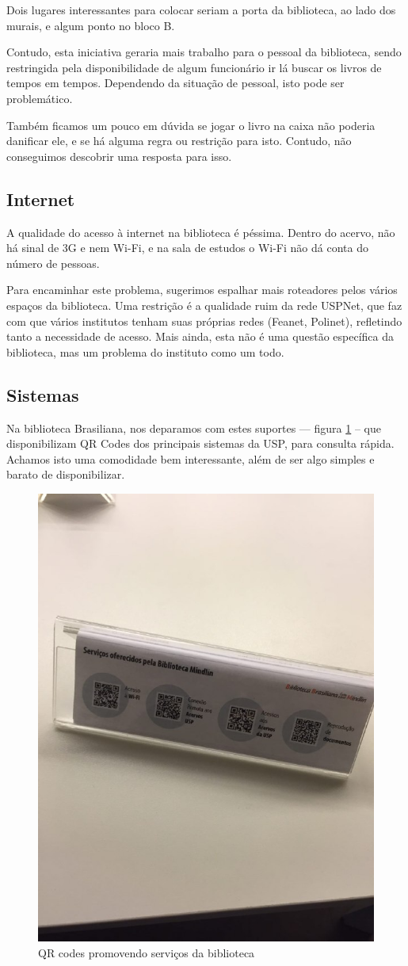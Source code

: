 \documentclass[titlepage]{article}
\begin{document}
Dois lugares interessantes para colocar seriam a porta da biblioteca, ao lado 
dos murais, e algum ponto no bloco B.

Contudo, esta iniciativa geraria mais trabalho para o pessoal da biblioteca,
sendo restringida pela disponibilidade de algum funcionário ir lá buscar os 
livros de tempos em tempos. Dependendo da situação de pessoal, isto pode ser
problemático.

Também ficamos um pouco em dúvida se jogar o livro na caixa não poderia 
danificar ele, e se há alguma regra ou restrição para isto. Contudo, não 
conseguimos descobrir uma resposta para isso.

\subsection{Internet}
A qualidade do acesso à internet na biblioteca é péssima. Dentro do acervo, não
há sinal de 3G e nem Wi-Fi, e na sala de estudos o Wi-Fi não dá conta do 
número de pessoas.

Para encaminhar este problema, sugerimos espalhar mais roteadores pelos vários 
espaços da biblioteca. Uma restrição é a qualidade ruim da rede USPNet, que 
faz com que vários institutos tenham suas próprias redes (Feanet, Polinet), 
refletindo tanto a necessidade de acesso. Mais ainda, esta não é uma questão
específica da biblioteca, mas um problema do instituto como um todo.

\subsection{Sistemas}
Na biblioteca Brasiliana, nos deparamos com estes suportes --- figura 
\ref{fig:qr} -- que disponibilizam QR Codes dos principais sistemas da USP, para 
consulta rápida. Achamos isto uma comodidade bem interessante, além de ser algo
simples e barato de disponibilizar.

\begin{figure}[ht!]
\caption{QR codes promovendo serviços da biblioteca}
\label{fig:qr}
\centering
\includegraphics[width=.6\textwidth]{qr}
\end{figure}
\end{document}
